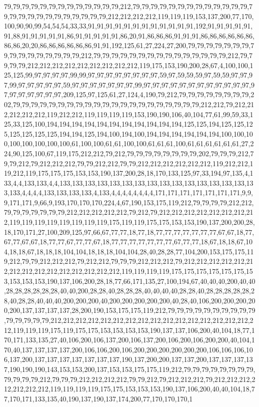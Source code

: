 79,79,79,79,79,79,79,79,79,79,79,79,79,212,79,79,79,79,79,79,79,79,79,79,79,79,79,79,79,79,79,79,79,79,79,79,79,79,79,212,212,212,212,119,119,119,153,137,200,77,170,100,90,90,99,54,54,54,33,33,91,91,91,91,91,91,91,91,91,91,91,91,192,91,91,91,91,91,91,88,91,91,91,91,91,86,91,91,91,91,91,86,20,91,86,86,86,91,91,91,86,86,86,86,86,86,86,86,20,20,86,86,86,86,86,86,91,91,192,125,61,27,224,27,200,79,79,79,79,79,79,79,79,79,79,79,79,79,79,79,79,212,79,79,79,79,79,79,79,79,79,79,79,79,79,79,79,212,79,79,79,79,212,212,212,212,212,212,212,212,212,119,175,153,190,200,28,67,4,100,100,125,125,99,97,97,97,97,99,99,97,97,97,97,97,97,97,97,59,97,59,59,59,97,59,59,97,97,97,99,97,97,97,97,97,59,97,97,97,97,97,97,97,99,97,97,97,97,97,97,97,97,97,97,97,97,97,97,97,97,97,97,97,209,125,97,125,61,27,124,4,190,79,212,79,79,79,79,79,79,79,79,202,79,79,79,79,79,79,79,79,79,79,79,79,79,79,79,79,79,79,79,79,79,212,212,79,212,212,212,212,212,119,212,212,119,119,119,119,153,190,190,106,40,104,77,61,99,59,33,125,33,125,100,194,194,194,194,194,194,194,194,194,194,194,125,125,194,125,125,125,125,125,125,125,194,194,125,194,100,194,100,194,194,194,194,194,194,100,100,100,100,100,100,100,100,61,100,100,61,61,100,100,61,61,61,100,61,61,61,61,61,61,27,224,90,125,100,67,119,175,212,212,79,212,79,79,79,79,79,79,79,79,202,79,79,79,212,79,79,212,79,212,212,212,79,79,212,212,79,79,212,212,212,212,212,212,119,212,212,119,212,119,175,175,175,153,153,190,137,200,28,18,170,133,125,97,33,194,97,135,4,133,4,4,133,133,4,4,133,133,133,133,133,133,133,133,133,133,133,133,133,133,133,133,133,4,4,4,4,133,133,133,133,4,133,4,4,4,4,4,4,4,4,171,171,171,171,171,171,171,9,9,9,171,171,9,66,9,193,170,170,170,224,4,67,190,153,175,119,212,79,79,79,79,212,212,79,79,79,79,79,79,79,212,212,212,212,212,79,212,79,212,212,212,212,212,212,212,212,119,119,119,119,119,119,119,119,175,119,119,175,175,153,153,190,137,200,200,28,18,170,171,27,100,209,125,97,66,67,77,77,18,77,18,77,77,77,77,77,77,77,67,67,18,77,67,77,67,67,18,77,77,67,77,77,67,18,77,77,77,77,77,77,77,67,77,77,18,67,18,18,67,104,18,18,67,18,18,18,104,104,18,18,18,104,104,28,40,28,28,77,104,200,153,175,175,119,212,79,79,212,212,212,79,212,212,79,79,79,212,212,212,79,212,212,212,212,212,212,212,212,212,212,212,212,212,212,212,119,119,119,119,175,175,175,175,175,175,153,153,153,153,190,137,106,200,28,18,77,66,171,135,27,100,194,67,40,40,40,200,40,40,28,28,28,28,28,28,40,40,200,28,28,40,28,28,28,40,40,40,40,28,28,40,28,28,28,28,28,28,40,28,28,40,40,40,200,200,200,40,200,200,200,200,200,40,28,40,106,200,200,200,200,200,137,137,137,137,28,200,190,153,175,175,119,212,79,79,79,79,79,79,79,79,79,79,79,79,79,79,79,212,212,212,212,212,212,212,212,212,212,212,212,212,212,212,212,212,119,119,119,175,119,175,175,153,153,153,153,190,137,137,106,200,40,104,18,77,170,171,133,135,27,40,106,200,106,137,200,106,137,200,106,200,106,200,200,40,104,170,40,137,137,137,137,200,106,106,200,106,200,200,200,200,200,200,106,106,106,106,137,200,137,137,137,137,137,137,137,190,137,200,200,137,137,200,137,137,137,137,190,190,190,143,153,153,200,137,153,153,175,175,119,212,79,79,79,79,79,79,79,79,79,79,79,79,212,79,79,79,212,212,212,212,79,79,212,79,212,212,212,79,212,212,212,212,212,212,212,119,119,119,119,175,175,153,153,153,190,137,106,200,40,40,104,18,77,170,171,133,135,40,190,137,190,137,174,200,77,170,170,170,1